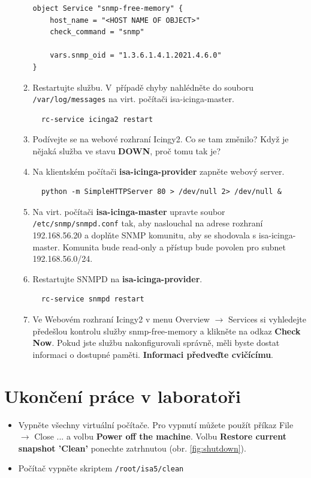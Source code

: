 \begin{itemize}
\begin{enumerate}
\begin{verbatim}
object Service "snmp-free-memory" {
    host_name = "<HOST NAME OF OBJECT>"
    check_command = "snmp"
    
    vars.snmp_oid = "1.3.6.1.4.1.2021.4.6.0"
}

\end{verbatim} 
            \item Restartujte službu. V~případě chyby nahlédněte do souboru {\tt /var/log/messages} na virt. počítači isa-icinga-master.
\begin{verbatim}
  rc-service icinga2 restart
\end{verbatim} 
          \item Podívejte se na webové rozhraní Icingy2. Co se tam změnilo? 
          Když je nějaká služba ve stavu {\bf DOWN}, proč tomu tak je?

          \item Na klientském počítači {\bf isa-icinga-provider} zapněte webový server.
\begin{verbatim}
  python -m SimpleHTTPServer 80 > /dev/null 2> /dev/null &
\end{verbatim}

          \item Na virt. počítači {\bf isa-icinga-master} upravte soubor {\tt /etc/snmp/snmpd.conf} tak, aby naslouchal na adrese rozhraní 192.168.56.20 a doplňte SNMP komunitu, aby se shodovala s isa-icinga-master. Komunita bude read-only
          a přístup bude povolen pro subnet 192.168.56.0/24.
          
          \item Restartujte SNMPD na {\bf isa-icinga-provider}.
\begin{verbatim}
  rc-service snmpd restart
\end{verbatim}
          \item Ve Webovém rozhraní Icingy2 v menu Overview $\rightarrow$
            Services si vyhledejte předešlou kontrolu služby snmp-free-memory a
            klikněte na odkaz {\bf Check Now}. Pokud jste službu nakonfigurovali správně, měli byste dostat informaci o dostupné paměti. {\bf Informaci předveďte cvičícímu}.
          
\end{enumerate}
\end{itemize}

\section*{Ukončení práce v laboratoři}
\begin{itemize}

  \item Vypněte všechny virtuální počítače. Pro vypnutí můžete použít příkaz File $\rightarrow$ Close ... a volbu {\bf Power off the machine}. Volbu {\bf Restore current snapshot 'Clean'} ponechte zatrhnutou (obr. \ref{fig:shutdown}).
  \item Počítač vypněte skriptem {\tt /root/isa5/clean}
\end{itemize}


